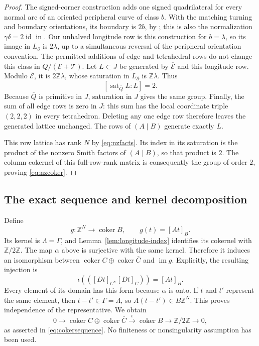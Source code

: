 \documentclass[11pt]{article}
\theoremstyle{definition}\newtheorem{definition}[theorem]{Definition}
\theoremstyle{remark}\newtheorem{remark}[theorem]{Remark}
\DeclareMathOperator{\im}{im}
\DeclareMathOperator{\coker}{coker}
\newcommand{\Z}{\mathbb Z}
\newcommand{\Ct}{\overline C}
\begin{document}
\begin{proof}
The signed-corner construction adds one signed quadrilateral for every
normal arc of an oriented peripheral curve of class $b$. With the
matching turning and boundary orientations, its boundary is $2b$,
by \cite[Section 7.1]{GHHHR}; this is also the normalization
$\gamma\delta=2\operatorname{id}$ in
\cite[Lemma 4.3(i)]{Neumann}. Our unhalved
longitude row is this construction for $b=\lambda$, so its image in
$L_{\partial}$ is $2\lambda$, up to a simultaneous reversal of the
peripheral orientation convention. The permitted additions of edge
and tetrahedral rows do not change this class in
$Q/(\mathscr E+\mathscr T)$. Let $L\subset J$ be generated by
$\overline{\mathscr E}$ and this longitude row. Modulo
$\overline{\mathscr E}$, it is $2\Z\lambda$, whose saturation in
$L_{\partial}$ is $\Z\lambda$. Thus
\[
 [\operatorname{sat}_{\overline Q}L:L]=2.
\]
Because $\overline Q$ is primitive in $J$, saturation in $J$ gives the
same group. Finally, the sum of all edge rows is zero in $J$: this sum
has the local coordinate triple $(2,2,2)$ in every tetrahedron.
Deleting any one edge row therefore leaves the generated lattice
unchanged. The rows of $(A\mid B)$ generate exactly $L$.

This row lattice has rank $N$ by \eqref{eq:nzfacts}. Its index in its
saturation is the product of the nonzero Smith factors of $(A\mid B)$,
so that product is $2$. The column cokernel of this full-row-rank matrix
is consequently the group of order $2$, proving \eqref{eq:nzcoker}.
\end{proof}

\subsection{The exact sequence and kernel decomposition}

Define
\[
 g:\Z^N\longrightarrow\coker B,\qquad g(t)=[At]_B.
\]
Its kernel is $\Lambda=\Gamma$, and Lemma~\ref{lem:longitude-index}
identifies its cokernel with $\Z/2\Z$. The map $\alpha$ above is
surjective with the same kernel. Therefore it induces an isomorphism
between $\coker C\oplus\coker\Ct$ and $\im g$. Explicitly, the
resulting injection is
\[
 \iota(([Dt]_C,[Dt]_{\Ct}))=[At]_B.
\]
Every element of its domain has this form because $\alpha$ is onto.
If $t$ and $t'$ represent the same element, then $t-t'\in\Gamma=
\Lambda$, so $A(t-t')\in B\Z^N$. This proves independence of the
representative. We obtain
\[
 0\longrightarrow\coker C\oplus\coker\Ct
 \xrightarrow{\iota}\coker B
 \longrightarrow\Z/2\Z\longrightarrow0,
\]
as asserted in \eqref{eq:cokersequence}. No finiteness or nonsingularity
assumption has been used.
\end{document}
